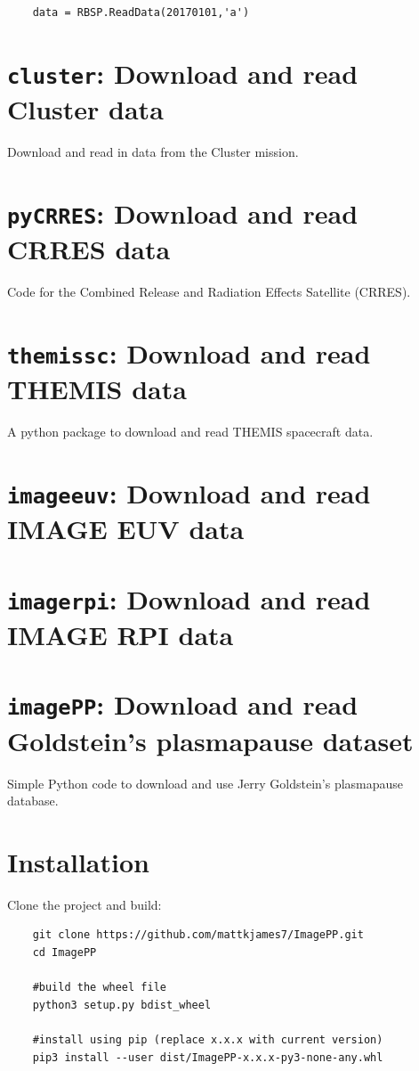 	\begin{verbatim}
	data = RBSP.ReadData(20170101,'a')
	\end{verbatim}
	
	


	\section{\texttt{cluster}: Download and read Cluster data}

	Download and read in data from the Cluster mission.


	\section{\texttt{pyCRRES}: Download and read CRRES data}

	Code for the Combined Release and Radiation Effects Satellite (CRRES).


	\section{\texttt{themissc}:  Download and read THEMIS data}

	A python package to download and read THEMIS spacecraft data.

	\section{\texttt{imageeuv}: Download and read IMAGE EUV data}

	\section{\texttt{imagerpi}: Download and read IMAGE RPI data}

	\section{\texttt{imagePP}: Download and read Goldstein's plasmapause dataset}

	Simple Python code to download and use Jerry Goldstein's plasmapause database.

	\section{Installation}
	
	Clone the project and build:
	\begin{verbatim}
	git clone https://github.com/mattkjames7/ImagePP.git
	cd ImagePP
	
	#build the wheel file
	python3 setup.py bdist_wheel
	
	#install using pip (replace x.x.x with current version)
	pip3 install --user dist/ImagePP-x.x.x-py3-none-any.whl
	\end{verbatim}
	
